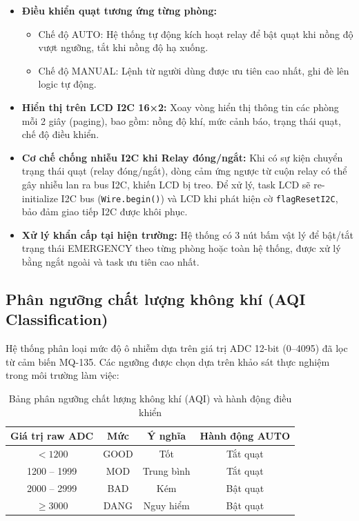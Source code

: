 \documentclass[../BTL_PTIT.tex]{subfiles}
\begin{document}
\begin{itemize}[label=\textbullet]
    \item \textbf{Điều khiển quạt tương ứng từng phòng:}
    \begin{itemize}[label=--]
        \item Chế độ AUTO: Hệ thống tự động kích hoạt relay để bật quạt khi nồng độ vượt ngưỡng, tắt khi nồng độ hạ xuống.
        \item Chế độ MANUAL: Lệnh từ người dùng được ưu tiên cao nhất, ghi đè lên logic tự động.
    \end{itemize}
    
    \item \textbf{Hiển thị trên LCD I2C 16×2:} Xoay vòng hiển thị thông tin các phòng mỗi 2 giây (paging), bao gồm: nồng độ khí, mức cảnh báo, trạng thái quạt, chế độ điều khiển.
    
    \item \textbf{Cơ chế chống nhiễu I2C khi Relay đóng/ngắt:} Khi có sự kiện chuyển trạng thái quạt (relay đóng/ngắt), dòng cảm ứng ngược từ cuộn relay có thể gây nhiễu lan ra bus I2C, khiến LCD bị treo. Để xử lý, task LCD sẽ re-initialize I2C bus (\texttt{Wire.begin()}) và LCD khi phát hiện cờ \texttt{flagResetI2C}, bảo đảm giao tiếp I2C được khôi phục.
    \item \textbf{Xử lý khẩn cấp tại hiện trường:} Hệ thống có 3 nút bấm vật lý để bật/tắt trạng thái EMERGENCY theo từng phòng hoặc toàn hệ thống, được xử lý bằng ngắt ngoài và task ưu tiên cao nhất.
\end{itemize}



\subsection{Phân ngưỡng chất lượng không khí (AQI Classification)}
Hệ thống phân loại mức độ ô nhiễm dựa trên giá trị ADC 12-bit (0–4095) đã lọc từ cảm biến MQ-135. Các ngưỡng được chọn dựa trên khảo sát thực nghiệm trong môi trường làm việc:

\begin{table}[H]
\centering
\caption{Bảng phân ngưỡng chất lượng không khí (AQI) và hành động điều khiển}
\label{tab:aqi_classification}
\begin{tabular}{|c|c|c|c|}
\hline
\textbf{Giá trị raw ADC} & \textbf{Mức} & \textbf{Ý nghĩa} & \textbf{Hành động AUTO} \\
\hline
$< 1200$ & GOOD & Tốt & Tắt quạt \\
1200 -- 1999 & MOD & Trung bình & Tắt quạt \\
2000 -- 2999 & BAD & Kém & Bật quạt \\
$\geq 3000$ & DANG & Nguy hiểm & Bật quạt \\
\hline
\end{tabular}
\end{table}
\end{document}
